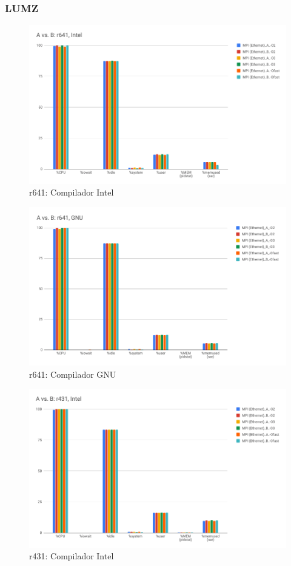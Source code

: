 \documentclass{article}
\begin{document}
\begin{appendices}
\subsubsection{LUMZ}
\begin{figure}[H]
    \centering
    \includegraphics[width=12cm]{Pictures/LUMZ_A_B_r641_Intel.png}
    \caption{r641: Compilador Intel}
    \label{fig:lumz_A_B_r641_intel}
\end{figure}

\begin{figure}[H]
    \centering
    \includegraphics[width=12cm]{Pictures/LUMZ_A_B_r641_GNU.png}
    \caption{r641: Compilador GNU}
    \label{fig:lumz_A_B_r641_gnu}
\end{figure}

\begin{figure}[H]
    \centering
    \includegraphics[width=12cm]{Pictures/LUMZ_A_B_r431_Intel.png}
    \caption{r431: Compilador Intel}
    \label{fig:lumz_A_B_r431_intel}
\end{figure}


\end{appendices}
\end{document}
